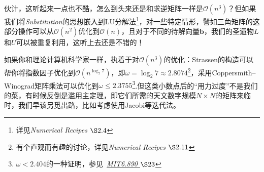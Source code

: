 伙计，这听起来一点也不酷，怎么到头来还是和求逆矩阵一样是$\mathcal{O}(n^3)$？但如果我们将\textit{Substitution}的思想嵌入到LU分解法\footnote{详见\textit{Numerical Recipes $\S 2.4$}}，对一些特定情形，譬如三角矩阵的这部分操作可以从$\mathcal{O}(n^2)$优化到$\mathcal{O}(n)$，且对于不同的待解向量$\bm{b}$，我们的圣遗物$L$和$U$可以被重复利用，这听上去还是不错的！

如果你和理论计算机科学家一样，执着于对$\mathcal{O}(n^3)$的优化：Strassen的构造可以帮你将指数因子优化到$\mathcal{O}(n^{\log_2 7})$，即$\omega  = \log_2 7 \approx 2.8074$\footnote{有个直观而有趣的讨论，详见\textit{Numerical Recipes $\S 2.11$}}，采用Coppersmith–Winograd矩阵乘法可以优化到$\omega \le 2.3755$\footnote{$\omega < 2.404$的一种证明，参见\ \href{https://people.csail.mit.edu/virgi/6.890/lecture23.pdf}{\textit{MIT6.890 $\S 23$}}}.但这类小数点后的“用力过度”不是我们的菜，有时候反倒是滥用主定理，即它们所需的天文数字规模$N\times N$的矩阵来临时，我们早该另觅出路，比如考虑使用Jacobi等迭代法。